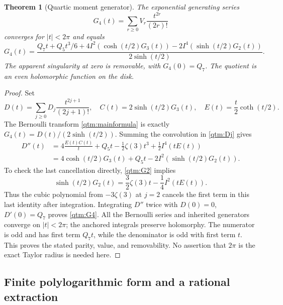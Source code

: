 \documentclass[11pt,a4paper]{article}
\numberwithin{equation}{section}
\theoremstyle{plain}
\newtheorem{theorem}{Theorem}[section]
\theoremstyle{definition}
\theoremstyle{remark}
\begin{document}
\begin{theorem}[Quartic moment generator]
\label{qtm:generator}
The exponential generating series
\begin{equation}\label{qtm:G4def}
 G_4(t)=\sum_{r\ge0}V_r\frac{t^{2r}}{(2r)!}
\end{equation}
converges for $|t|<2\pi$ and equals
\begin{equation}\label{qtm:G4}
 \boxed{\displaystyle
 G_4(t)=\frac{Q_7t+Q_5t^3/6
       +4I^2\!\left(\cosh(t/2)G_3(t)\right)
       -2I^4\!\left(\sinh(t/2)G_2(t)\right)}
       {2\sinh(t/2)}.}
\end{equation}
The apparent singularity at zero is removable, with $G_4(0)=Q_7$.
The quotient is an even holomorphic function on the disk.
\end{theorem}

\begin{proof}
Set
\[
 D(t)=\sum_{j\ge0}D_j\frac{t^{2j+1}}{(2j+1)!},\quad
 C(t)=2\sinh(t/2)G_3(t),\quad E(t)=\frac t2\coth(t/2).
\]
The Bernoulli transform \eqref{qtm:mainformula} is exactly
$G_4(t)=D(t)/(2\sinh(t/2))$.  Summing the convolution in
\eqref{qtm:Dj} gives
\begin{align*}
 D''(t)
   &=4\frac{E(t)C(t)}t+Q_5t-\frac12\zeta(3)t^3
       +\frac12I^4(tE(t))\\
   &=4\cosh(t/2)G_3(t)+Q_5t
       -2I^2\!\left(\sinh(t/2)G_2(t)\right).
\end{align*}
To check the last cancellation directly, \eqref{qtm:G2} implies
\[
 \sinh(t/2)G_2(t)=\frac32\zeta(3)t-\frac14I^2(tE(t)).
\]
Thus the cubic polynomial from $-3\zeta(3)$ at $j=2$ cancels
the first term in this last identity after integration.  Integrating
$D''$ twice with $D(0)=0$, $D'(0)=Q_7$ proves
\eqref{qtm:G4}.  All the Bernoulli series and inherited generators
converge on $|t|<2\pi$; the anchored integrals preserve holomorphy.
The numerator is odd and has first term $Q_7t$, while the denominator
is odd with first term $t$.  This proves the stated parity, value, and
removability.  No assertion that $2\pi$ is the exact Taylor radius is
needed here.
\end{proof}

\subsection{Finite polylogarithmic form and a rational extraction}
\end{document}
